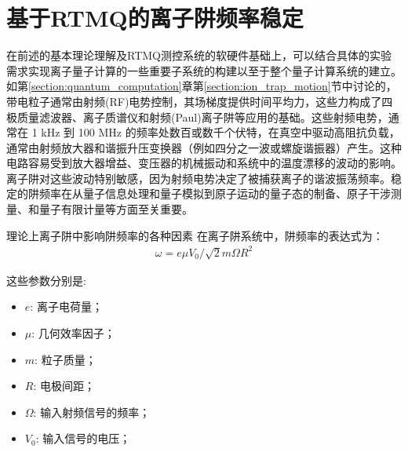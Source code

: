 \newpage
\section[基于RTMQ的离子阱频率稳定]{基于RTMQ的离子阱频率稳定\label{section:trap_frequency_stablization}}

在前述的基本理论理解及RTMQ测控系统的软硬件基础上，可以结合具体的实验需求实现离子量子计算的一些重要子系统的构建以至于整个量子计算系统的建立。
如第\ref{section:quantum_computation}章第\ref{section:ion_trap_motion}节中讨论的，带电粒子通常由射频(RF)电势控制，其场梯度提供时间平均力，这些力构成了四极质量滤波器、离子质谱仪和射频(Paul)离子阱等应用的基础\cite[]{Dehmelt_1990, Paul_1990}。这些射频电势，通常在 1 kHz 到 100 MHz 的频率处数百或数千个伏特，在真空中驱动高阻抗负载，通常由射频放大器和谐振升压变换器（例如四分之一波或螺旋谐振器）产生\cite[]{Siverns_Simkins_Weidt_Hensinger_2012}。这种电路容易受到放大器增益、变压器的机械振动和系统中的温度漂移的波动的影响。离子阱对这些波动特别敏感，因为射频电势决定了被捕获离子的谐波振荡频率。稳定的阱频率在从量子信息处理\cite[]{Blatt_Wineland_2008, Monroe_Kim_2013}和量子模拟\cite[]{Richerme_Gong_Lee_Senko_Smith_Foss_Feig_Michalakis_Gorshkov_Monroe_2014, Jurcevic_Lanyon_Hauke_Hempel_Zoller_Blatt_Roos_2014}到原子运动的量子态的制备\cite[]{Leibfried_Blatt_Monroe_Wineland_2003}、原子干涉测量\cite[]{Johnson_Neyenhuis_Mizrahi_Wong_Campos_Monroe_2015}、和量子有限计量\cite[]{Chou_Hume_Koelemeij_Wineland_Rosenband_2010}等方面至关重要。


理论上离子阱中影响阱频率的各种因素
在离子阱系统中，阱频率的表达式为：
\begin{align}
    \omega=e\mu V_0/\sqrt{2}m\Omega R^2 \label{eq:trap_frequency}
\end{align}

这些参数分别是:
\begin{itemize}
    \item $e$: 离子电荷量；
    \item $\mu$: 几何效率因子；
    \item $m$: 粒子质量；
    \item $R$: 电极间距；
    \item $\Omega$: 输入射频信号的频率；
    \item $V_0$: 输入信号的电压；
\end{itemize}


